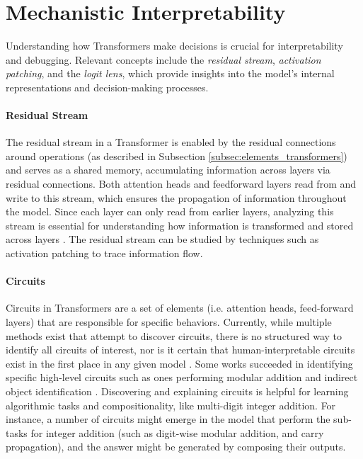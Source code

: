 \section{Mechanistic Interpretability}\label{sec:mech_interp}

Understanding how Transformers make decisions is crucial for interpretability and debugging. Relevant concepts include the \emph{residual stream}, \emph{activation patching}, and the \emph{logit lens}, which provide insights into the model's internal representations and decision-making processes.

\paragraph{Residual Stream}
The residual stream in a Transformer is enabled by the residual connections around operations (as described in Subsection \ref{subsec:elements_transformers}) and serves as a shared memory, accumulating information across layers via residual connections. Both attention heads and feedforward layers read from and write to this stream, which ensures the propagation of information throughout the model. Since each layer can only read from earlier layers, analyzing this stream is essential for understanding how information is transformed and stored across layers \parencite{elhage2021mathematical}. The residual stream can be studied by techniques such as activation patching to trace information flow.

\paragraph{Circuits}
Circuits in Transformers are a set of elements (i.e. attention heads, feed-forward layers) that are responsible for specific behaviors. Currently, while multiple methods exist that attempt to discover circuits, there is no structured way to identify all circuits of interest, nor is it certain that human-interpretable circuits exist in the first place in any given model \parencite{ferrando_primer_2024}. Some works succeeded in identifying specific high-level circuits such as ones performing modular addition \parencite{nanda_progress_2022,zhong_clock_2023} and indirect object identification \parencite{wang_interpretability_2022}. Discovering and explaining circuits is helpful for learning algorithmic tasks and compositionality, like multi-digit integer addition. For instance, a number of circuits might emerge in the model that perform the sub-tasks for integer addition (such as digit-wise modular addition, and carry propagation), and the answer might be generated by composing their outputs.

